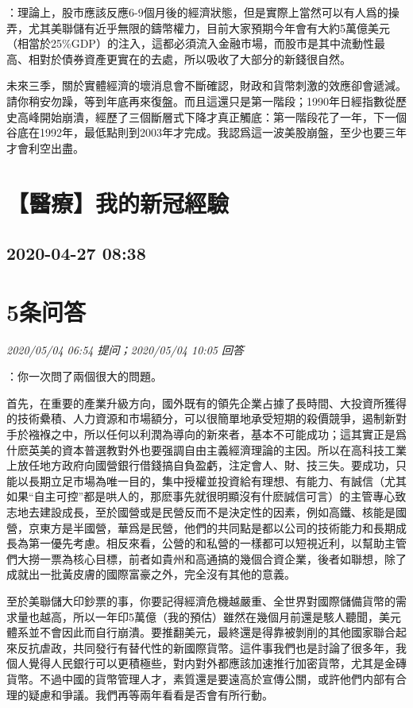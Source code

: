 \documentclass[twocolumn]{ctexart}
\begin{document}
：理論上，股市應該反應6-9個月後的經濟狀態，但是實際上當然可以有人爲的操弄，尤其美聯儲有近乎無限的鑄幣權力，目前大家預期今年會有大約5萬億美元（相當於25\%GDP）的注入，這都必須流入金融市場，而股市是其中流動性最高、相對於債券資產更實在的去處，所以吸收了大部分的新錢很自然。

未來三季，關於實體經濟的壞消息會不斷確認，財政和貨幣刺激的效應卻會遞減。請你稍安勿躁，等到年底再來復盤。而且這還只是第一階段；1990年日經指數從歷史高峰開始崩潰，經歷了三個斷層式下降才真正觸底：第一階段花了一年，下一個谷底在1992年，最低點則到2003年才完成。我認爲這一波美股崩盤，至少也要三年才會利空出盡。
\\


\section{【醫療】我的新冠經驗}
\subsection{2020-04-27 08:38}


\section{5条问答}

\textit{\hfill\noindent\small 2020/05/04 06:54 提问；2020/05/04 10:05 回答}

：你一次問了兩個很大的問題。

首先，在重要的產業升級方向，國外既有的領先企業占據了長時間、大投資所獲得的技術纍積、人力資源和市場額分，可以很簡單地承受短期的殺價競爭，遏制新對手於襁褓之中，所以任何以利潤為導向的新來者，基本不可能成功；這其實正是爲什麽英美的資本普選教對外也要强調自由主義經濟理論的主因。所以在高科技工業上放任地方政府向國營銀行借錢搞自負盈虧，注定會人、財、技三失。要成功，只能以長期立足市場為唯一目的，集中授權並投資給有理想、有能力、有誠信（尤其如果“自主可控”都是哄人的，那麽事先就很明顯沒有什麽誠信可言）的主管專心致志地去建設成長，至於國營或是民營反而不是決定性的因素，例如高鐵、核能是國營，京東方是半國營，華爲是民營，他們的共同點是都以公司的技術能力和長期成長為第一優先考慮。相反來看，公營的和私營的一樣都可以短視近利，以幫助主管們大撈一票為核心目標，前者如貴州和高通搞的幾個合資企業，後者如聯想，除了成就出一批黃皮膚的國際富豪之外，完全沒有其他的意義。

至於美聯儲大印鈔票的事，你要記得經濟危機越嚴重、全世界對國際儲備貨幣的需求量也越高，所以一年印5萬億（我的預估）雖然在幾個月前還是駭人聽聞，美元體系並不會因此而自行崩潰。要推翻美元，最終還是得靠被剝削的其他國家聯合起來反抗虐政，共同發行有替代性的新國際貨幣。這件事我們也是討論了很多年，我個人覺得人民銀行可以更積極些，對内對外都應該加速推行加密貨幣，尤其是金磚貨幣。不過中國的貨幣管理人才，素質還是要遠高於宣傳公關，或許他們内部有合理的疑慮和爭議。我們再等兩年看看是否會有所行動。
\\
\end{document}
